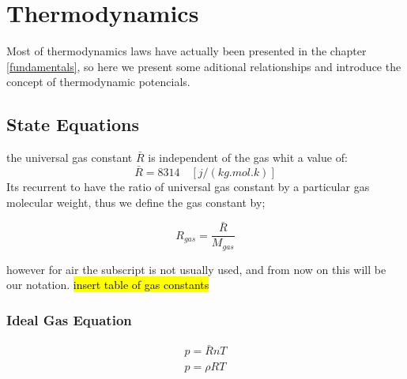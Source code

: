 \chapter{Thermodynamics}
Most of thermodynamics laws have actually been presented in the chapter \ref{fundamentals}, so here we present some aditional relationships and introduce the concept of thermodynamic potencials.
\newpage

\section{State Equations}
the universal gas constant $\bar{R}$ is independent of the gas whit a value of:
\begin{equation}
\bar{R}=8314 \quad [j/(kg.mol.k)]
\end{equation}
Its recurrent to have the ratio of universal gas constant by a particular gas molecular weight, thus we define the gas constant by;

\begin{equation}
    R_{gas}=\frac{\bar{R}}{M_{gas}}
\end{equation}

however for air the subscript is not usually used, and from now on this will be our notation.
\hl{insert table of gas constants}

\subsection{Ideal Gas Equation}
\begin{eqnarray}
    p=\bar{R}nT\\
    p=\rho R T
\end{eqnarray}



